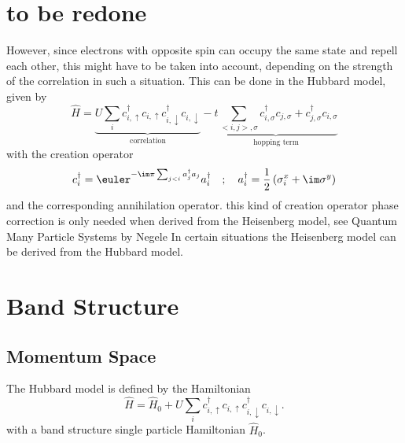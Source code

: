 \documentclass[a4paper,10pt]{report}
\begin{document}
\section{to be redone}

However, since electrons with opposite spin can occupy the same state and repell each other, this might have to be taken into account, depending on the 
strength of the correlation in such a situation. 
This can be done in the Hubbard model, given by
\begin{equation}
 \hat{H} = \underbrace{U \sum_i c^{\dagger}_{i,\uparrow}c_{i,\uparrow} c^{\dagger}_{i,\downarrow}c_{i,\downarrow} }_{\text{correlation}}
	    -\underbrace{t \sum_{<i,j>,\sigma} c^{\dagger}_{i,\sigma}c_{j,\sigma} + c^{\dagger}_{j,\sigma}c_{i,\sigma} }_{\text{hopping term}}
\end{equation}
with the creation operator 
\begin{equation}
 c^{\dagger}_{i} = \euler^{-\im\pi \sum_{j<i} a^{\dagger}_j a_j } a^{\dagger}_i\quad ; \quad a^{\dagger}_i = \frac12 \left( \sigma^x_i + \im \sigma^y \right)
\end{equation}
and the corresponding annihilation operator. 
 this kind of creation operator phase correction is only needed when derived from the Heisenberg model, see Quantum Many Particle Systems by Negele
In certain situations the Heisenberg model can be derived from the Hubbard model. 





\section{Band Structure}


\subsection{Momentum Space}

The Hubbard model is defined by the Hamiltonian
\begin{equation}
 \hat{H} = \hat{H}_0
	   + U \sum_i c^{\dagger}_{i,\uparrow}c_{i,\uparrow} c^{\dagger}_{i,\downarrow}c_{i,\downarrow} 
	    . \label{Hubbard_space}
\end{equation}
with a band structure single particle Hamiltonian $\hat{H}_0$.
\end{document}
